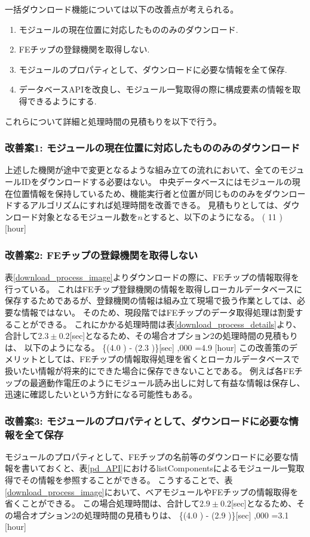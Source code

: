 一括ダウンロード機能については以下の改善点が考えられる。
\begin{enumerate}
  \item モジュールの現在位置に対応したもののみのダウンロード.
  \item FEチップの登録機関を取得しない.
  \item モジュールのプロパティとして、ダウンロードに必要な情報を全て保存.
  \item データベースAPIを改良し、モジュール一覧取得の際に構成要素の情報を取得できるようにする.
\end{enumerate}

これらについて詳細と処理時間の見積もりを以下で行う。

\subsubsection{改善案1: モジュールの現在位置に対応したもののみのダウンロード}
上述した機関が途中で変更となるような組み立ての流れにおいて、全てのモジュールIDをダウンロードする必要はない。
中央データベースにはモジュールの現在位置情報を保持しているため、機能実行者と位置が同じもののみをダウンロードするアルゴリズムにすれば処理時間を改善できる。
見積もりとしては、ダウンロード対象となるモジュール数を$n$とすると、以下のようになる。
\bbb
( 11  ) \times {} [{\rm hour}]
\eee

\subsubsection{改善案2: FEチップの登録機関を取得しない}
表\ref{download_process_image}よりダウンロードの際に、FEチップの情報取得を行っている。
これはFEチップ登録機関の情報を取得しローカルデータベースに保存するためであるが、登録機関の情報は組み立て現場で扱う作業としては、必要な情報ではない。
そのため、現段階ではFEチップのデータ取得処理は割愛することができる。
これにかかる処理時間は表\ref{download_process_details}より、合計して$2.3\pm0.2$[sec]となるため、その場合オプション2の処理時間の見積もりは、
以下のようになる。
\bbb
\{(4.0 ) - (2.3 )\}[\rm{sec}] ,000 =4.9  [{\rm hour}]
\eee
この改善策のデメリットとしては、FEチップの情報取得処理を省くとローカルデータベースで扱いたい情報が将来的にできた場合に保存できないことである。
例えば各FEチップの最適動作電圧のようにモジュール読み出しに対して有益な情報は保存し、迅速に確認したいという方針になる可能性もある。

\subsubsection{改善案3: モジュールのプロパティとして、ダウンロードに必要な情報を全て保存}
モジュールのプロパティとして、FEチップの名前等のダウンロードに必要な情報を書いておくと、表\ref{pd_API}におけるlistComponentsによるモジュール一覧取得でその情報を参照することができる。
こうすることで、表\ref{download_process_image}において、ベアモジュールやFEチップの情報取得を省くことができる。
この場合処理時間は、合計して$2.9\pm0.2$[sec]となるため、その場合オプション2の処理時間の見積もりは、
\bbb
\{(4.0 ) - (2.9 )\}[\rm{sec}] ,000 =3.1  [{\rm hour}] 
\eee


